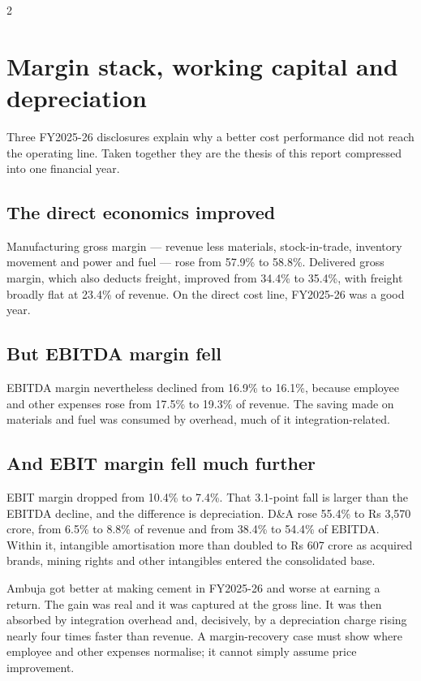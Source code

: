 \begin{paracol}{2}
\section{Margin stack, working capital and depreciation}

Three FY2025-26 disclosures explain why a better cost performance did not reach the
operating line. Taken together they are the thesis of this report compressed into one
financial year.

\subsection{The direct economics improved}

Manufacturing gross margin — revenue less materials, stock-in-trade, inventory
movement and power and fuel — rose from 57.9\% to 58.8\%. Delivered gross margin,
which also deducts freight, improved from 34.4\% to 35.4\%, with freight broadly flat
at 23.4\% of revenue. On the direct cost line, FY2025-26 was a good year.

\subsection{But EBITDA margin fell}

EBITDA margin nevertheless declined from 16.9\% to 16.1\%, because employee and other
expenses rose from 17.5\% to 19.3\% of revenue. The saving made on materials and fuel
was consumed by overhead, much of it integration-related.

\subsection{And EBIT margin fell much further}

EBIT margin dropped from 10.4\% to 7.4\%. That 3.1-point fall is larger than the
EBITDA decline, and the difference is depreciation. D\&A rose 55.4\% to Rs 3,570
crore, from 6.5\% to 8.8\% of revenue and from 38.4\% to 54.4\% of EBITDA. Within it,
intangible amortisation more than doubled to Rs 607 crore as acquired brands, mining
rights and other intangibles entered the consolidated base.

\begin{keybox}
Ambuja got better at making cement in FY2025-26 and worse at earning a return. The
gain was real and it was captured at the gross line. It was then absorbed by
integration overhead and, decisively, by a depreciation charge rising nearly four
times faster than revenue. A margin-recovery case must show where employee and other
expenses normalise; it cannot simply assume price improvement.
\end{keybox}


\end{paracol}
